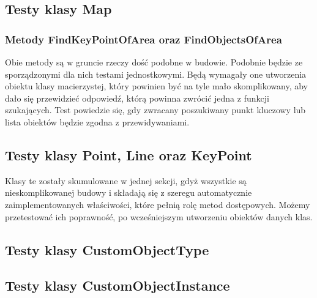 \documentclass[a4paper,11pt]{article}
\newcommand\tab[1][0.6cm]{\hspace*{#1}}
\begin{document}
\subsection{Testy klasy Map}

\subsubsection{Metody FindKeyPointOfArea oraz FindObjectsOfArea}

\tab Obie metody są w gruncie rzeczy dość podobne w budowie. Podobnie będzie ze sporządzonymi dla nich testami jednostkowymi. Będą wymagały one utworzenia obiektu klasy macierzystej, który powinien być na tyle mało skomplikowany, aby dało się przewidzieć odpowiedź, którą powinna zwrócić jedna z funkcji szukających. Test powiedzie się, gdy zwracany poszukiwany punkt kluczowy lub lista obiektów będzie zgodna z przewidywaniami.

\subsection{Testy klasy Point, Line oraz KeyPoint}

\tab Klasy te zostały skumulowane w jednej sekcji, gdyż wszystkie są nieskomplikowanej budowy i składają się z szeregu automatycznie zaimplementowanych właściwości, które pełnią rolę metod dostępowych. Możemy przetestować ich poprawność, po wcześniejszym utworzeniu obiektów danych klas.

\subsection{Testy klasy CustomObjectType}

\subsection{Testy klasy CustomObjectInstance}
\end{document}
